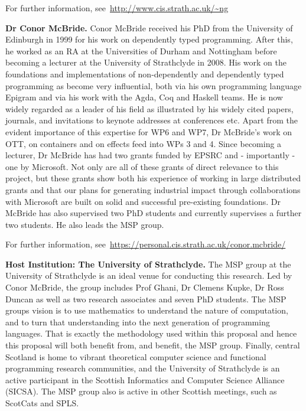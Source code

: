 \documentclass[a4paper,11pt]{article}
\begin{document}
For further information, see~\url{http://www.cis.strath.ac.uk/~ng}

\textbf{Dr Conor McBride.} Conor McBride received his PhD from the
University of Edinburgh in 1999 for his work on dependently typed
programming. After this, he worked as an RA at the Universities of
Durham and Nottingham before becoming a lecturer at the University of
Strathclyde in 2008. His work on the foundations and implementations
of non-dependently and dependently typed programming as become very
influential, both via his own programming language Epigram and via his
work with the Agda, Coq and Haskell teams. He is now widely regarded
as a leader of his field as illustrated by his widely cited papers,
journals, and invitations to keynote addresses at conferences
etc. Apart from the evident importance of this expertise for WP6 and
WP7, Dr McBride's work on OTT, on containers and on effects feed into
WPs 3 and 4. Since becoming a lecturer, Dr McBride has had two grants
funded by EPSRC and - importantly - one by Microsoft. Not only are all
of these grants of direct relevance to this project, but these grants
show both his experience of working in large distributed grants and
that our plans for generating industrial impact through collaborations
with Microsoft are built on solid and successful pre-existing
foundations. Dr McBride has also supervised two PhD students and
currently supervises a further two students. He also leads the MSP
group.

For further information,
see~\url{https://personal.cis.strath.ac.uk/conor.mcbride/}

\textbf{Host Institution: The University of Strathclyde.} The MSP
group at the University of Strathclyde is an ideal venue for
conducting this research. Led by Conor McBride, the group includes
Prof Ghani, Dr Clemens Kupke, Dr Ross Duncan as well as two research
associates and seven PhD students. The MSP groups vision is to use
mathematics to understand the nature of computation, and to turn that
understanding into the next generation of programming languages. That
is exactly the methodology used within this proposal and hence this
proposal will both benefit from, and benefit, the MSP group.
Finally, central Scotland is home to vibrant theoretical computer
science and functional programming research communities, and the
University of Strathclyde is an active participant in the Scottish
Informatics and Computer Science Alliance (SICSA). The MSP group also
is active in other Scottish meetings, such as ScotCats and SPLS.
\end{document}

